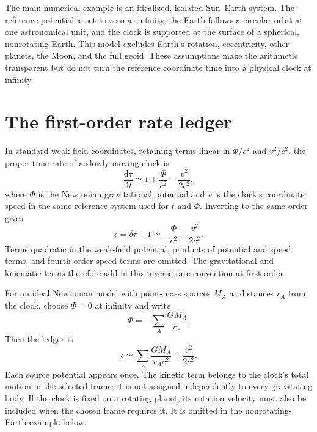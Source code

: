 \documentclass[12pt]{article}
\begin{document}
The main numerical example is an idealized, isolated Sun--Earth system. The reference potential is set to zero at infinity, the Earth follows a circular orbit at one astronomical unit, and the clock is supported at the surface of a spherical, nonrotating Earth. This model excludes Earth's rotation, eccentricity, other planets, the Moon, and the full geoid. These assumptions make the arithmetic transparent but do not turn the reference coordinate time into a physical clock at infinity.

\section{The first-order rate ledger}

In standard weak-field coordinates, retaining terms linear in $\Phi/c^2$ and $v^2/c^2$, the proper-time rate of a slowly moving clock is \cite{Einstein1905,Einstein1911}
\begin{equation}
  \frac{\mathrm{d}\tau}{\mathrm{d}t}
  \simeq1+\frac{\Phi}{c^2}-\frac{v^2}{2c^2},
  \label{eq:proper-rate}
\end{equation}
where $\Phi$ is the Newtonian gravitational potential and $v$ is the clock's coordinate speed in the same reference system used for $t$ and $\Phi$. Inverting to the same order gives
\begin{equation}
  \boxed{\epsilon=\delta\tau-1
  \simeq-\frac{\Phi}{c^2}+\frac{v^2}{2c^2}.}
  \label{eq:ledger}
\end{equation}
Terms quadratic in the weak-field potential, products of potential and speed terms, and fourth-order speed terms are omitted. The gravitational and kinematic terms therefore add in this inverse-rate convention at first order.

For an ideal Newtonian model with point-mass sources $M_A$ at distances $r_A$ from the clock, choose $\Phi=0$ at infinity and write
\begin{equation}
  \Phi=-\sum_A\frac{GM_A}{r_A}.
  \label{eq:potential-sum}
\end{equation}
Then the ledger is
\begin{equation}
  \epsilon\simeq\sum_A\frac{GM_A}{r_Ac^2}
  +\frac{v^2}{2c^2}.
  \label{eq:source-ledger}
\end{equation}
Each source potential appears once. The kinetic term belongs to the clock's total motion in the selected frame; it is not assigned independently to every gravitating body. If the clock is fixed on a rotating planet, its rotation velocity must also be included when the chosen frame requires it. It is omitted in the nonrotating-Earth example below.
\end{document}
